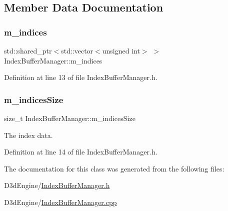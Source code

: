 \subsection{Member Data Documentation}
\mbox{\label{class_index_buffer_manager_ade308a27ee394d550f91c919411df37b}} 
\subsubsection{\texorpdfstring{m\+\_\+indices}{m\_indices}}
{\footnotesize\ttfamily std\+::shared\+\_\+ptr$<$std\+::vector$<$unsigned int$>$ $>$ Index\+Buffer\+Manager\+::m\+\_\+indices\hspace{0.3cm}{\ttfamily [private]}}



Definition at line 13 of file Index\+Buffer\+Manager.\+h.

\mbox{\label{class_index_buffer_manager_ae21d575fdd0af30b3050c5747f20ad66}} 
\subsubsection{\texorpdfstring{m\+\_\+indices\+Size}{m\_indicesSize}}
{\footnotesize\ttfamily size\+\_\+t Index\+Buffer\+Manager\+::m\+\_\+indices\+Size\hspace{0.3cm}{\ttfamily [private]}}



The index data. 



Definition at line 14 of file Index\+Buffer\+Manager.\+h.



The documentation for this class was generated from the following files\+:\begin{DoxyCompactItemize}
\item 
D3d\+Engine/\mbox{\hyperlink{_index_buffer_manager_8h}{Index\+Buffer\+Manager.\+h}}\item 
D3d\+Engine/\mbox{\hyperlink{_index_buffer_manager_8cpp}{Index\+Buffer\+Manager.\+cpp}}\end{DoxyCompactItemize}
